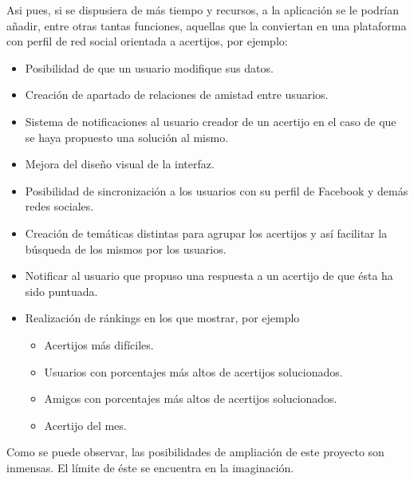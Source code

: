 Asi pues, si se dispusiera de más tiempo y recursos, a la aplicación se le podrían añadir, entre otras tantas funciones, aquellas que la conviertan en una plataforma con perfil de red social orientada a acertijos, por ejemplo:

\begin{itemize}
    \item Posibilidad de que un usuario modifique sus datos.
    \item Creación de apartado de relaciones de amistad entre usuarios.
    \item Sistema de notificaciones al usuario creador de un acertijo en el caso de que se haya propuesto una solución al mismo.
    \item Mejora del diseño visual de la interfaz.
    \item Posibilidad de sincronización a los usuarios con su perfil de Facebook y demás redes sociales.
    \item Creación de temáticas distintas para agrupar los acertijos y así facilitar la búsqueda de los mismos por los usuarios.
    \item Notificar al usuario que propuso una respuesta a un acertijo de que ésta ha sido puntuada.
    \item Realización de ránkings en los que mostrar, por ejemplo 
        \begin{itemize}
            \item Acertijos más difíciles.
            \item Usuarios con porcentajes más altos de acertijos solucionados.
            \item Amigos con porcentajes más altos de acertijos solucionados.
            \item Acertijo del mes.
        \end{itemize}
\end{itemize}

Como se puede observar, las posibilidades de ampliación de este proyecto son inmensas. El límite de éste se encuentra en la imaginación.